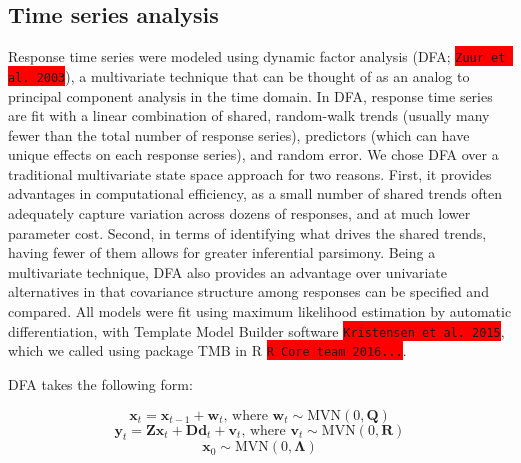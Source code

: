 \documentclass[notitlepage]{article}
\begin{document}

\subsection*{Time series analysis}
Response time series were modeled using dynamic factor analysis (DFA; \colorbox{red}{\lstinline{Zuur et al. 2003}}), a multivariate technique that can be thought of as an analog to principal component analysis in the time domain. In DFA, response time series are fit with a linear combination of shared, random-walk trends (usually many fewer than the total number of response series), predictors (which can have unique effects on each response series), and random error. We chose DFA over a traditional multivariate state space approach for two reasons. First, it provides advantages in computational efficiency, as a small number of shared trends often adequately capture variation across dozens of responses, and at much lower parameter cost. Second, in terms of identifying what drives the shared trends, having fewer of them allows for greater inferential parsimony. Being a multivariate technique, DFA also provides an advantage over univariate alternatives in that covariance structure among responses can be specified and compared. All models were fit using maximum likelihood estimation by automatic differentiation, with Template Model Builder software \colorbox{red}{\lstinline{Kristensen et al. 2015}}, which we called using package TMB in R \colorbox{red}{\lstinline{R Core team 2016...}}.

DFA takes the following form:

\begin{equation}
    \textbf{x}_t = \textbf{x}_{t-1} + \textbf{w}_t\textrm{, where } \textbf{w}_t \sim \textrm{MVN}(0,\textbf{Q})
\end{equation}
\begin{equation}
    \textbf{y}_t = \textbf{Zx}_t + \textbf{Dd}_t + \textbf{v}_t\textrm{, where } \textbf{v}_t \sim \textrm{MVN}(0,\textbf{R})
\end{equation}
\begin{equation}
    \textbf{x}_0 \sim \textrm{MVN}(0,\bm{\Lambda})
\end{equation}
\end{document}
